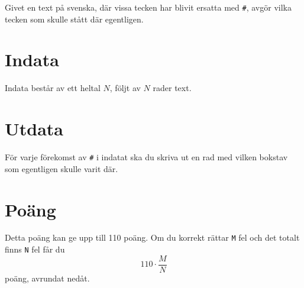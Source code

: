 
Givet en text på svenska, där vissa tecken har blivit ersatta med \texttt{#}, avgör vilka tecken som skulle stått där egentligen.

\section*{Indata}
Indata består av ett heltal $N$, följt av $N$ rader text.

\section*{Utdata}
För varje förekomst av \texttt{#} i indatat ska du skriva ut en rad med vilken bokstav som egentligen skulle varit där.

\section*{Poäng}

Detta poäng kan ge upp till 110 poäng. Om du korrekt rättar \texttt{M} fel och det totalt finns \texttt{N} fel får du 
$$110 \cdot \frac{M}{N}$$
poäng, avrundat nedåt.
